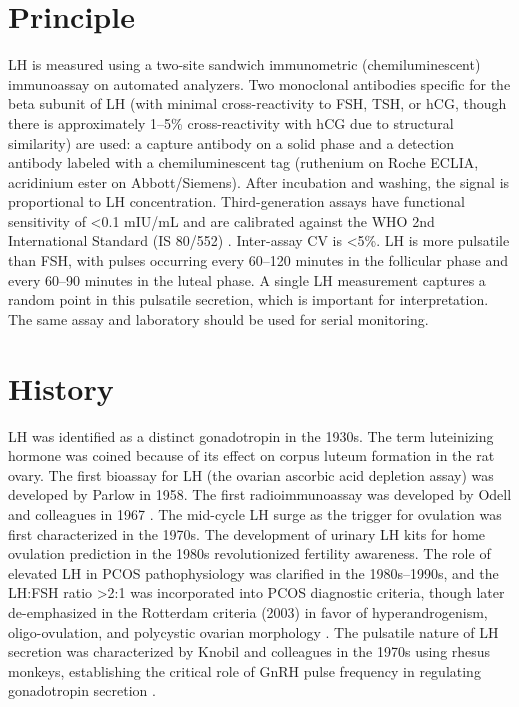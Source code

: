 \section*{Principle}
LH is measured using a two-site sandwich immunometric (chemiluminescent) immunoassay on automated analyzers. Two monoclonal antibodies specific for the beta subunit of LH (with minimal cross-reactivity to FSH, TSH, or hCG, though there is approximately 1--5\% cross-reactivity with hCG due to structural similarity) are used: a capture antibody on a solid phase and a detection antibody labeled with a chemiluminescent tag (ruthenium on Roche ECLIA, acridinium ester on Abbott/Siemens). After incubation and washing, the signal is proportional to LH concentration. Third-generation assays have functional sensitivity of <0.1 mIU/mL and are calibrated against the WHO 2nd International Standard (IS 80/552) \cite{tietz2023textbook}. Inter-assay CV is <5\%. LH is more pulsatile than FSH, with pulses occurring every 60--120 minutes in the follicular phase and every 60--90 minutes in the luteal phase. A single LH measurement captures a random point in this pulsatile secretion, which is important for interpretation. The same assay and laboratory should be used for serial monitoring.

\section*{History}
LH was identified as a distinct gonadotropin in the 1930s. The term luteinizing hormone was coined because of its effect on corpus luteum formation in the rat ovary. The first bioassay for LH (the ovarian ascorbic acid depletion assay) was developed by Parlow in 1958. The first radioimmunoassay was developed by Odell and colleagues in 1967 \cite{odell1967radioimmunoassay}. The mid-cycle LH surge as the trigger for ovulation was first characterized in the 1970s. The development of urinary LH kits for home ovulation prediction in the 1980s revolutionized fertility awareness. The role of elevated LH in PCOS pathophysiology was clarified in the 1980s--1990s, and the LH:FSH ratio >2:1 was incorporated into PCOS diagnostic criteria, though later de-emphasized in the Rotterdam criteria (2003) in favor of hyperandrogenism, oligo-ovulation, and polycystic ovarian morphology \cite{rotterdam2004revised}. The pulsatile nature of LH secretion was characterized by Knobil and colleagues in the 1970s using rhesus monkeys, establishing the critical role of GnRH pulse frequency in regulating gonadotropin secretion \cite{knobil1980neuroendocrine}.

